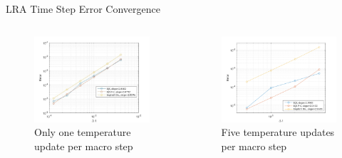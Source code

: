 \documentclass[8pt,xcolor=dvipnames]{beamer}
\begin{document}
\begin{frame}{LRA Time Step Error Convergence}
\begin{columns}

\begin{figure}
\includegraphics[width=\linewidth]{figures/lra_bad.png}
\caption{Only one temperature update per macro step}
\end{figure}

\begin{figure}
\includegraphics[width=\linewidth]{figures/lra_mp_convergence.png}
\caption{Five temperature updates per macro step}
\end{figure}

\end{columns}
\end{frame}
\end{document}
